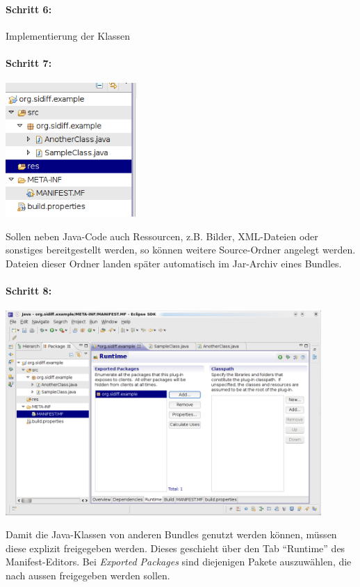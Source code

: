 \documentclass[10pt,a4paper]{scrartcl}
\begin{document}
\paragraph{Schritt 6:}
Implementierung der Klassen

\paragraph{Schritt 7:}
\begin{center}
\includegraphics[width=5cm]{pics/newbundle6.png}
\end{center}
Sollen neben Java-Code auch Ressourcen, z.B. Bilder, XML-Dateien oder sonstiges
bereitgestellt werden, so können weitere Source-Ordner angelegt werden. Dateien
dieser Ordner landen später automatisch im Jar-Archiv eines Bundles.

\paragraph{Schritt 8:}
\begin{center}
\includegraphics[width=12cm]{pics/newbundle7.png}
\end{center}
Damit die Java-Klassen von anderen Bundles genutzt werden können, müssen diese
explizit freigegeben werden. Dieses geschieht über den Tab ``Runtime'' des
Manifest-Editors. Bei \emph{Exported Packages} sind diejenigen Pakete auszuwählen,
die nach aussen freigegeben werden sollen.
\end{document}
